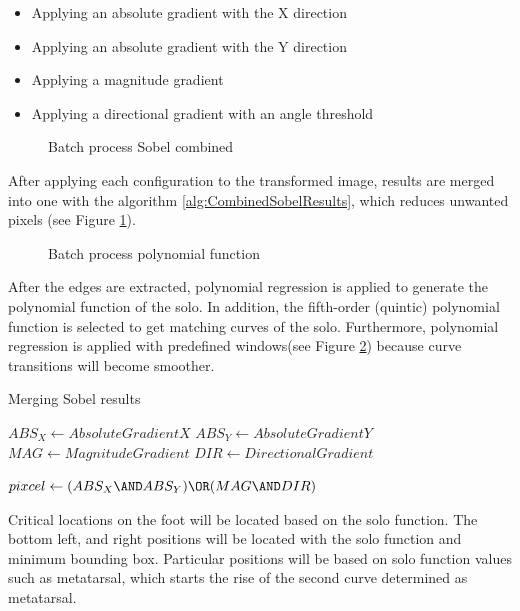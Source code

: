 \begin{itemize}
  \item Applying an absolute gradient with the X direction
  \item Applying an absolute gradient with the Y direction
  \item Applying a magnitude gradient
  \item Applying a directional gradient with an angle threshold 
\end{itemize}

\begin{figure}[htbp]
\centering
{}
\caption{Batch process Sobel combined}
\label{fig:BatchProcessEdge}
\end{figure}

After applying each configuration to the transformed image, results are merged into one with the algorithm  \ref{alg:CombinedSobelResults}, which reduces unwanted pixels (see Figure \ref{fig:BatchProcessEdge}). 

\begin{figure}[htbp]
\centering
{}
\caption{Batch process polynomial function}
\label{fig:BatchProcessLine}
\end{figure}

After the edges are extracted, polynomial regression is applied to generate the polynomial function of the solo. In addition, the fifth-order (quintic) polynomial function is selected to get matching curves of the solo. Furthermore, polynomial regression is applied with predefined windows(see Figure \ref{fig:BatchProcessLine}) because curve transitions will become smoother.

\begin{algorithm}
\caption{Merging Sobel results}\label{alg:CombinedSobelResults}
\begin{algorithmic}

\STATE $ABS_X \gets Absolute Gradient X$
\STATE $ABS_Y \gets Absolute Gradient Y$
\STATE $MAG \gets Magnitude Gradient$
\STATE $DIR \gets Directional Gradient$

    \STATE $pixcel \gets (ABS_X \AND ABS_Y) \OR (MAG \AND DIR)$
\ENDFOR

\end{algorithmic}
\end{algorithm}

Critical locations on the foot will be located based on the solo function. The bottom left, and right positions will be located with the solo function and minimum bounding box. Particular positions will be based on solo function values such as metatarsal, which starts the rise of the second curve determined as metatarsal.


